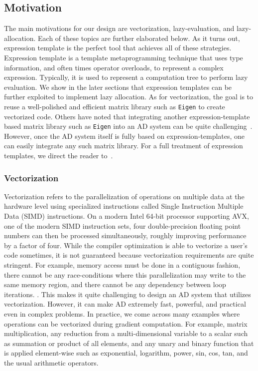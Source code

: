 \subsection{Motivation}\label{ssec:motivation}

The main motivations for our design are vectorization, lazy-evaluation, and lazy-allocation.
Each of these topics are further elaborated below.
As it turns out, expression template is the perfect tool that achieves
all of these strategies.
Expression template is a template metaprogramming technique that 
uses type information, and often times operator overloads, to represent a complex expression.
Typically, it is used to represent a computation tree to perform lazy evaluation.
We show in the later sections that expression templates can be further exploited
to implement lazy allocation.
As for vectorization, the goal is to reuse a well-polished and efficient
matrix library such as \verb|Eigen| to create vectorized code.
Others have noted that integrating another expression-template based matrix library 
such as \verb|Eigen| into an AD system can be quite challenging~\cite{hogan:2014}.
However, once the AD system itself is fully based on expression-templates,
one can easily integrate any such matrix library.
For a full treatment of expression templates, 
we direct the reader to~\cite{vandevoorde:2002}.

\subsubsection{Vectorization}

Vectorization refers to the parallelization of operations on multiple data at the hardware level 
using specialized instructions called Single Instruction Multiple Data (SIMD) instructions.
On a modern Intel 64-bit processor supporting AVX, one of the modern SIMD instruction sets,
four double-precision floating point numbers can then be processed simultaneously,
roughly improving performance by a factor of four.
While the compiler optimization is able to vectorize a user's code sometimes, it is not guaranteed
because vectorization requirements are quite stringent. 
For example, memory access must be done in a contiguous fashion, 
there cannot be any race-conditions where this parallelization may write to the same memory region,
and there cannot be any dependency between loop iterations.
.
This makes it quite challenging to design an AD system that utilizes vectorization.
However, it can make AD extremely fast, powerful, and practical even in complex problems.
In practice, we come across many examples where operations can be vectorized during gradient computation.
For example, matrix multiplication, any reduction from a multi-dimensional variable to a scalar such as
summation or product of all elements, and any unary and binary function that is applied element-wise such as
exponential, logarithm, power, sin, cos, tan, and the usual arithmetic operators.

